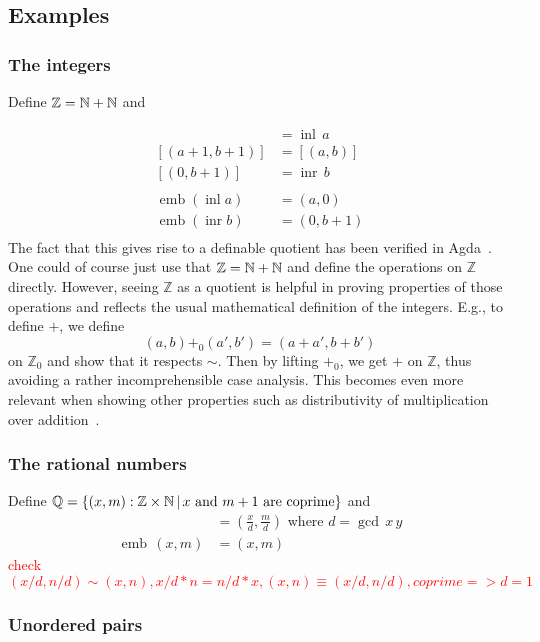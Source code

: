 \documentclass{llncs}
\newcommand{\bocks}[1]{[#1]}
\DeclareMathOperator*{\emb}{\mathrm{emb}}
\newcommand{\Z}{\mathbb{Z}}
\newcommand{\todo}[1]{\textcolor{red}{#1}}
\DeclareMathOperator*{\inl}{\mathop{\mathrm{inl}}}
\DeclareMathOperator*{\inr}{\mathop{\mathrm{inr}}}
\begin{document}
\subsection{Examples}\label{sec:dquotients:examples}

\subsubsection*{The integers}
Define $\Z =\nat + \nat $ and 

\begin{align*}
\bocks{(a,0)} &= \inl\,a\\
\bocks{(a+1,b+1)} &= \bocks{(a,b)}\\
\bocks{(0,b+1)} &= \inr\,b\\\\
\emb (\inl a) &= (a,0)\\
\emb (\inr b) &= (0,b+1)\\
\end{align*}
The fact that this gives rise to a definable quotient has been verified in Agda~\cite{nuo:report:2010}.
 One could of course just use that $\Z=\nat + \nat$ and define the operations on $\Z$ directly. However, seeing  $\Z$ as a quotient is helpful in proving properties of those operations and reflects the usual mathematical definition of the integers. E.g., to define $+$, we define 
\[(a,b){+_0}(a', b')= (a+a',b+b')\]
on $\Z_0$ and show that it respects $\sim$. Then by lifting $+_0$, we get $+$ on $\Z$, thus avoiding a rather incomprehensible case analysis. This becomes even more relevant when showing other properties such as distributivity of multiplication over addition~\cite{nuo:report:2010}.

\subsubsection*{The rational numbers}

Define $\Q = \set{(x,m):\Z\times\nat \,|\, x \text{ and } m+1 \text{ are coprime}}$ and
\begin{align*}
\bocks{(x,m)}&=\left(\frac x d, \frac m d\right) \text{ where } d = \gcd\,x \,y\\
\emb \,(x,m) &= (x,m)
\end{align*}
\todo{check $(x/d,n/d)\sim(x,n), x/d*n= n/d*x, (x,n)\equiv(x/d,n/d),coprime=>d=1$}

\subsubsection*{Unordered pairs}
\end{document}
